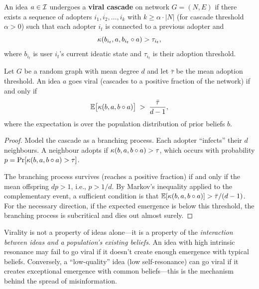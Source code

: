 \begin{definition}
\label{def:viral}
An idea $a \in \mathcal{I}$ undergoes a \textbf{viral cascade} on network
$G = (N, E)$ if there exists a sequence of adopters
$i_1, i_2, \ldots, i_k$ with $k \ge \alpha \cdot |N|$ (for
cascade threshold $\alpha > 0$) such that each adopter $i_t$
is connected to a previous adopter and
\[
  \kappa(b_{i_t}, a, b_{i_t} \circ a) > \tau_{i_t},
\]
where $b_{i_t}$ is user $i_t$'s current ideatic state and
$\tau_{i_t}$ is their adoption threshold.
\end{definition}

\begin{theorem}
\label{thm:virality-threshold}
Let $G$ be a random graph with mean degree $d$ and let
$\bar{\tau}$ be the mean adoption threshold.  An idea $a$
goes viral (cascades to a positive fraction of the network)
if and only if
\[
  \mathbb{E}\bigl[\kappa(b, a, b \circ a)\bigr]
  \;>\; \frac{\bar{\tau}}{d - 1},
\]
where the expectation is over the population distribution of
prior beliefs $b$.
\end{theorem}

\begin{proof}
Model the cascade as a branching process.  Each adopter
``infects'' their $d$ neighbours.  A neighbour adopts if
$\kappa(b, a, b \circ a) > \tau$, which occurs with
probability $p = \Pr[\kappa(b, a, b \circ a) > \tau]$.

The branching process survives (reaches a positive fraction)
if and only if the mean offspring $dp > 1$, i.e.,
$p > 1/d$.  By Markov's inequality applied to the
complementary event, a sufficient condition is that
$\mathbb{E}[\kappa(b,a,b \circ a)] > \bar{\tau} / (d-1)$.
For the necessary direction, if the expected emergence is
below this threshold, the branching process is subcritical
and dies out almost surely.
\end{proof}

\begin{interpretation}
Virality is not a property of ideas alone---it is a
property of the \emph{interaction between ideas and a
population's existing beliefs}.  An idea with high intrinsic
resonance may fail to go viral if it doesn't create enough
emergence with typical beliefs.  Conversely, a ``low-quality''
idea (low self-resonance) can go viral if it creates exceptional
emergence with common beliefs---this is the mechanism behind
the spread of misinformation.
\end{interpretation}

